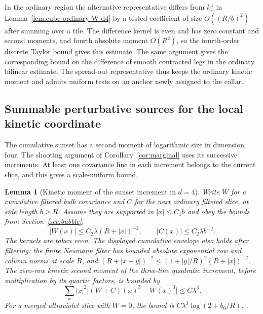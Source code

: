 \documentclass[11pt]{article}
\newtheorem{lemma}[theorem]{Lemma}
\theoremstyle{definition}
\begin{document}
In the ordinary region the alternative representative differs
from \(k_x^{\mathrm a}\) in Lemma~\ref{lem:cube-ordinary-W-d4}
by a tested coefficient of size \(O((R/b)^2)\) after summing
over a tile. The difference kernel is even and has zero
constant and second moments, and fourth absolute moment
\(O(R^2)\), so the fourth-order discrete Taylor bound
gives this estimate. The same argument gives the
corresponding bound on the difference of smooth contracted
legs in the ordinary bilinear estimate. The spread-out
representative thus keeps the ordinary kinetic moment and
admits uniform tests on an anchor newly assigned to the
collar.

\subsection{Summable perturbative sources for the local kinetic coordinate}
\label{sec:kinetic-increments}

The cumulative sunset has a second moment of logarithmic size in
dimension four. The shooting argument of
Corollary~\ref{cor:marginal} uses its successive increments.
At least one covariance line in each increment belongs to the
current slice, and this gives a scale-uniform bound.

\begin{lemma}[Kinetic moment of the sunset increment in \(d=4\)]
\label{lem:kinetic-increment}
Write \(W\) for a cumulative filtered bulk covariance and \(C\) for
the next ordinary filtered slice, at side length \(b\ge R\).
Assume they are supported in \(|x|\le C_1 b\) and obey the
bounds from Section~\ref{sec:bubble},
\begin{equation}
 |W(x)|\le C_2\lambda (R+|x|)^{-2},\qquad
 |C(x)|\le C_2\lambda b^{-2}.
\end{equation}
The kernels are taken even. The displayed cumulative envelope
also holds after filtering: the finite Neumann filter has bounded
absolute exponential row and column norms at scale \(R\), and
\((R+|x-y|)^{-2}\le (1+|y|/R)^2(R+|x|)^{-2}\).
The zero-row kinetic second moment
of the three-line quadratic increment, before multiplication by
its quartic factors, is bounded by
\begin{equation}
 \sum_x |x|^2\big|(W+C)(x)^3-W(x)^3\big|\le C\lambda^3 .
\end{equation}
For a merged ultraviolet slice with \(W=0\), the bound is
\(C\lambda^3\log(2+b_0/R)\).
\end{lemma}
\end{document}
